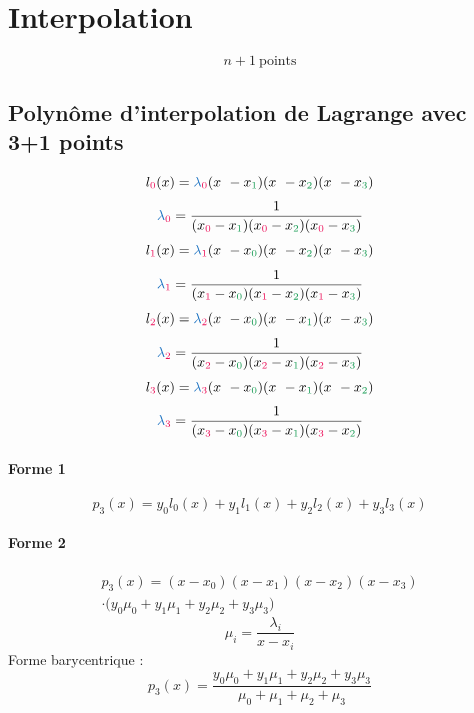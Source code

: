 \documentclass[resume]{subfiles}
\begin{document}
    \section{Interpolation}
    $$\boxed{n+1\ \text{points}}$$
    \subsection{Polynôme d'interpolation de Lagrange avec 3+1 points}
    $$l_{\textcolor{OrangeRed}{0}}(x)=\textcolor{RoyalBlue}{\lambda}_{\textcolor{OrangeRed}{0}}(x_{\ }-x_{\textcolor{ForestGreen}{1}})(x_{\ }-x_{\textcolor{ForestGreen}{2}})(x_{\ }-x_{\textcolor{ForestGreen}{3}})$$
    $$\textcolor{RoyalBlue}{\lambda}_{\textcolor{OrangeRed}{0}}=\frac{1}{(x_{\textcolor{OrangeRed}{0}}-x_{\textcolor{ForestGreen}{1}})(x_{\textcolor{OrangeRed}{0}}-x_{\textcolor{ForestGreen}{2}})(x_{\textcolor{OrangeRed}{0}}-x_{\textcolor{ForestGreen}{3}})}$$
    $$l_{\textcolor{OrangeRed}{1}}(x)=\textcolor{RoyalBlue}{\lambda}_{\textcolor{OrangeRed}{1}}(x_{\ }-x_{\textcolor{ForestGreen}{0}})(x_{\ }-x_{\textcolor{ForestGreen}{2}})(x_{\ }-x_{\textcolor{ForestGreen}{3}})$$
    $$\textcolor{RoyalBlue}{\lambda}_{\textcolor{OrangeRed}{1}}=\frac{1}{(x_{\textcolor{OrangeRed}{1}}-x_{\textcolor{ForestGreen}{0}})(x_{\textcolor{OrangeRed}{1}}-x_{\textcolor{ForestGreen}{2}})(x_{\textcolor{OrangeRed}{1}}-x_{\textcolor{ForestGreen}{3}})}$$
    $$l_{\textcolor{OrangeRed}{2}}(x)=\textcolor{RoyalBlue}{\lambda}_{\textcolor{OrangeRed}{2}}(x_{\ }-x_{\textcolor{ForestGreen}{0}})(x_{\ }-x_{\textcolor{ForestGreen}{1}})(x_{\ }-x_{\textcolor{ForestGreen}{3}})$$
    $$\textcolor{RoyalBlue}{\lambda}_{\textcolor{OrangeRed}{2}}=\frac{1}{(x_{\textcolor{OrangeRed}{2}}-x_{\textcolor{ForestGreen}{0}})(x_{\textcolor{OrangeRed}{2}}-x_{\textcolor{ForestGreen}{1}})(x_{\textcolor{OrangeRed}{2}}-x_{\textcolor{ForestGreen}{3}})}$$
    $$l_{\textcolor{OrangeRed}{3}}(x)=\textcolor{RoyalBlue}{\lambda}_{\textcolor{OrangeRed}{3}}(x_{\ }-x_{\textcolor{ForestGreen}{0}})(x_{\ }-x_{\textcolor{ForestGreen}{1}})(x_{\ }-x_{\textcolor{ForestGreen}{2}})$$
    $$\textcolor{RoyalBlue}{\lambda}_{\textcolor{OrangeRed}{3}}=\frac{1}{(x_{\textcolor{OrangeRed}{3}}-x_{\textcolor{ForestGreen}{0}})(x_{\textcolor{OrangeRed}{3}}-x_{\textcolor{ForestGreen}{1}})(x_{\textcolor{OrangeRed}{3}}-x_{\textcolor{ForestGreen}{2}})}$$
    \paragraph{Forme 1}
    $$p_3(x)=y_0l_0(x)+y_1l_1(x)+y_2l_2(x)+y_3l_3(x)$$
    \paragraph{Forme 2}
    \begin{multline*}
    p_3(x)=(x-x_0)(x-x_1)(x-x_2)(x-x_3)\\ \cdot\big(y_0\mu_0+y_1\mu_1+y_2\mu_2+y_3\mu_3\big)    
    \end{multline*}
    $$\mu_i=\frac{\lambda_i}{x-x_i}$$
    Forme barycentrique :
    $$p_3(x)=\frac{y_0\mu_0+y_1\mu_1+y_2\mu_2+y_3\mu_3}{\mu_0+\mu_1+\mu_2+\mu_3}$$
\end{document}
